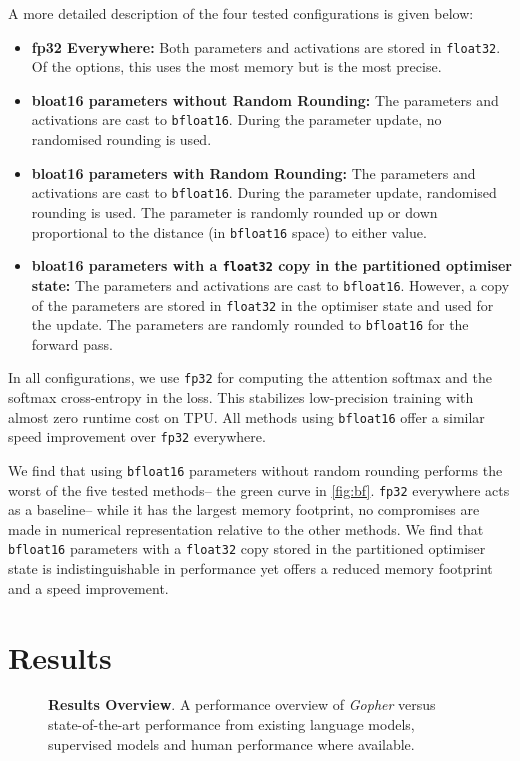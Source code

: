 \documentclass[11pt, a4paper, logo, internal, copyright, nonumbering]{deepmind}
\newcommand{\gopher}{\textit{Gopher}\xspace}
\begin{document}
A more detailed description of the four tested configurations is given below:
\begin{itemize}
    \item {\bf fp32 Everywhere:} Both parameters and activations are stored in \texttt{float32}. Of the options, this uses the most memory but is the most precise.
    \item {\bf bloat16 parameters without Random Rounding:} The parameters and activations are cast to \texttt{bfloat16}. During the parameter update, no randomised rounding is used. 
    \item {\bf bloat16 parameters with Random Rounding:} The parameters and activations are cast to \texttt{bfloat16}. During the parameter update, randomised rounding is used. The parameter is randomly rounded up or down proportional to the distance (in \texttt{bfloat16} space) to either value. 
    \item {\bf bloat16 parameters with a \texttt{float32} copy in the partitioned optimiser state:} The parameters and activations are cast to \texttt{bfloat16}. However, a copy of the parameters are stored in \texttt{float32} in the optimiser state and used for the update. The parameters are randomly rounded to \texttt{bfloat16} for the forward pass. 
\end{itemize}

In all configurations, we use \texttt{fp32} for computing the attention softmax and the softmax cross-entropy in the loss. This stabilizes low-precision training with almost zero runtime cost on TPU. All methods using \texttt{bfloat16} offer a similar  speed improvement over \texttt{fp32} everywhere.

We find that using \texttt{bfloat16} parameters without random rounding performs the worst of the five tested methods-- the green curve in \autoref{fig:bf}.
\texttt{fp32} everywhere acts as a baseline-- while it has the largest memory footprint, no compromises are made in numerical representation relative to the other methods.
We find that \texttt{bfloat16} parameters with a \texttt{float32} copy stored in the partitioned optimiser state is indistinguishable in performance yet offers a reduced memory footprint and a  speed improvement.

\section{Results}
\label{app:results}

\begin{figure}[t]
    \centering
    \caption{\textbf{Results Overview}. A performance overview of \gopher versus state-of-the-art performance from existing language models, supervised models and human performance where available.}
    \label{fig:results_overview}
\end{figure}
\end{document}
